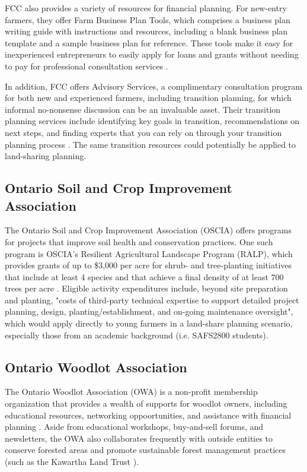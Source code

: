 \documentclass{report}
\begin{document}
\hspace{24pt}FCC also provides a variety of resources for financial planning. For new-entry farmers, they offer Farm Business Plan Tools, which comprises a business plan writing guide with instructions and resources, including a blank business plan template and a sample business plan for reference. These tools make it easy for inexperienced entrepreneurs to easily apply for loans and grants without needing to pay for professional consultation services \parencite{fcc_businessplan}.

\hspace{24pt}In addition, FCC offers Advisory Services, a complimentary consultation program for both new and experienced farmers, including transition planning, for which informal no-nonsense discussion can be an invaluable asset. Their transition planning services include identifying key goals in transition, recommendations on next steps, and finding experts that you can rely on through your transition planning process \parencite{fcc_transition}. The same transition resources could potentially be applied to land-sharing planning.

\subsection{Ontario Soil and Crop Improvement Association}

\hspace{24pt}The Ontario Soil and Crop Improvement Association (OSCIA) offers programs for projects that improve soil health and conservation practices. One such program is OSCIA's Resilient Agricultural Landscape Program (RALP), which provides grants of up to \$3,000 per acre for shrub- and tree-planting initiatives that include at least 4 species and that achieve a final density of at least 700 trees per acre \parencite{oscp_ralp}. Eligible activity expenditures include, beyond site preparation and planting, "costs of third-party technical expertise to support detailed project planning, design, planting/establishment, and on-going maintenance oversight", which would apply directly to young farmers in a land-share planning scenario, especially those from an academic background (i.e. SAFS2800 students).

\subsection{Ontario Woodlot Association}

\hspace{24pt}The Ontario Woodlot Association (OWA) is a non-profit membership organization that provides a wealth of supports for woodlot owners, including educational resources, networking oppoortunities, and assistance with financial planning \parencite{onwoodlot}. Aside from educational workshops, buy-and-sell forums, and newsletters, the OWA also collaborates frequently with outside entities to conserve forested areas and promote sustainable forest management practices (such as the Kawartha Land Trust \parencite{kawartha}).
\end{document}
